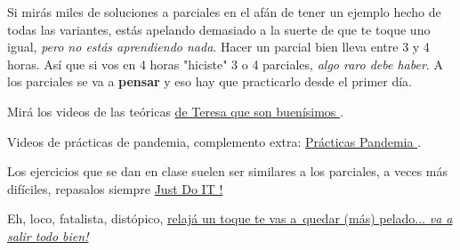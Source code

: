 {\begin{minipage}{0.7\textwidth}
    Si mirás miles de soluciones a parciales en el afán de tener un ejemplo hecho de todas las
    variantes, estás apelando demasiado a la suerte de que te toque uno igual, \textit{pero no estás aprendiendo nada}.
    Hacer un parcial bien lleva entre 3 y 4 horas. Así que si vos en 4 horas "hiciste" 3 o 4 parciales, \textit{algo raro debe haber}.
    A los parciales se va a \textbf{pensar} y eso hay que practicarlo desde el primer día.\par\bigskip

    Mirá los videos de las teóricas \href{\videosTeresa}{de Teresa que son buenísimos }.\par\medskip
    Videos de prácticas de pandemia, complemento extra: \href{\videosPracticas}{Prácticas Pandemia }.\par\bigskip

    Los ejercicios que se dan en clase suelen ser similares a los parciales,
    a veces más difíciles, repasalos siempre \href{\justDoIt}{Just Do IT !}
  \end{minipage}
}
\vspace*{\fill}

Eh, loco, fatalista, distópico, \href{\dontWorryAboutAThing}{relajá un toque te vas a\
  quedar (más) pelado...  \textit{va a salir todo bien!}}
